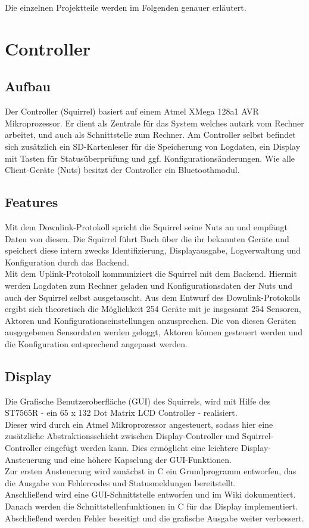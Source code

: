 \documentclass[12pt,a4paper]{article}
\begin{document}
Die einzelnen Projektteile werden im Folgenden genauer erläutert.

\section{Controller}

\subsection{Aufbau}

Der Controller (Squirrel) basiert auf einem Atmel XMega 128a1 AVR Mikroprozessor.
Er dient als Zentrale für das System welches autark vom Rechner arbeitet, und auch als Schnittstelle zum Rechner.
Am Controller selbst befindet sich zusätzlich ein SD-Kartenleser für die Speicherung von Logdaten, ein Display mit Tasten für Statusüberprüfung und ggf. Konfigurationsänderungen.
Wie alle Client-Geräte (Nuts) besitzt der Controller ein Bluetoothmodul.\\

\subsection{Features}
Mit dem Downlink-Protokoll spricht die Squirrel seine Nuts an und empfängt Daten von diesen. Die Squirrel führt Buch über die ihr bekannten Geräte und speichert diese intern zwecks Identifizierung, Displayausgabe, Logverwaltung und Konfiguration durch das Backend.\\
Mit dem Uplink-Protokoll kommuniziert die Squirrel mit dem Backend. Hiermit werden Logdaten zum Rechner geladen und Konfigurationsdaten der Nuts und auch der Squirrel selbst ausgetauscht.
Aus dem Entwurf des Downlink-Protokolls ergibt sich theoretisch die Möglichkeit 254 Geräte mit je insgesamt 254 Sensoren, Aktoren und Konfigurationseinstellungen anzusprechen. Die von diesen Geräten ausgegebenen Sensordaten werden geloggt, Aktoren können gesteuert werden und die Konfiguration entsprechend angepasst werden.

\subsection{Display}

Die Grafische Benutzeroberfläche (GUI) des Squirrels, wird mit Hilfe des ST7565R - ein 65 x 132 Dot Matrix LCD Controller - realisiert. \\
Dieser wird durch ein Atmel Mikroprozessor angesteuert, sodass hier eine zusätzliche Abstraktionsschicht zwischen Display-Controller und Squirrel-Controller eingefügt werden kann. Dies ermöglicht eine leichtere Display-Ansteuerung und eine höhere Kapselung der GUI-Funktionen. \\
Zur ersten Ansteuerung wird zunächst in C ein Grundprogramm entworfen, das die Ausgabe von Fehlercodes und Statusmeldungen bereitstellt. \\
Anschließend wird eine GUI-Schnittstelle entworfen und im Wiki dokumentiert.
Danach werden die Schnittstellenfunktionen in C für das Display implementiert.
Abschließend werden Fehler beseitigt und die grafische Ausgabe weiter verbessert.
\end{document}
